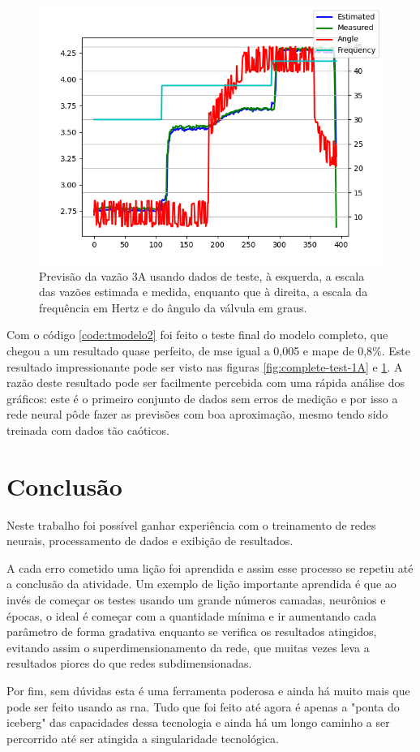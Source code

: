 \documentclass[12pt]{article}
\begin{document}
\begin{figure}
    \centering
    \includegraphics{results/complete-test-3A.png}
    \caption{Previsão da vazão 3A usando dados de teste, à esquerda, a escala das vazões estimada e medida, enquanto que à direita, a escala da frequência em Hertz e do ângulo da válvula em graus.}
    \label{fig:complete-test-3A}
\end{figure}

Com o código \ref{code:tmodelo2} foi feito o teste final do modelo completo, que chegou a um resultado quase perfeito, de \acrshort{mse} igual a 0,005 e \acrshort{mape} de 0,8\%. Este resultado impressionante pode ser visto nas figuras \ref{fig:complete-test-1A} e \ref{fig:complete-test-3A}.
A razão deste resultado pode ser facilmente percebida com uma rápida análise dos gráficos: este é o primeiro conjunto de dados sem erros de medição e por isso a rede neural pôde fazer as previsões com boa aproximação, mesmo tendo sido treinada com dados tão caóticos.

\section{Conclusão}

Neste trabalho foi possível ganhar experiência com o treinamento de redes neurais, processamento de dados e exibição de resultados.

A cada erro cometido uma lição foi aprendida e assim esse processo se repetiu até a conclusão da atividade.
Um exemplo de lição importante aprendida é que ao invés de começar os testes usando um grande números camadas, neurônios e épocas, o ideal é começar com a quantidade mínima e ir aumentando cada parâmetro de forma gradativa enquanto se verifica os resultados atingidos, evitando assim o superdimensionamento da rede, que muitas vezes leva a resultados piores do que redes subdimensionadas.

Por fim, sem dúvidas esta é uma ferramenta poderosa e ainda há muito mais que pode ser feito usando as \acrlong{rna}. Tudo que foi feito até agora é apenas a "ponta do iceberg" das capacidades dessa tecnologia e ainda há um longo caminho a ser percorrido até ser atingida a singularidade tecnológica.

\printglossary[type=\acronymtype]
\printglossary
\end{document}
